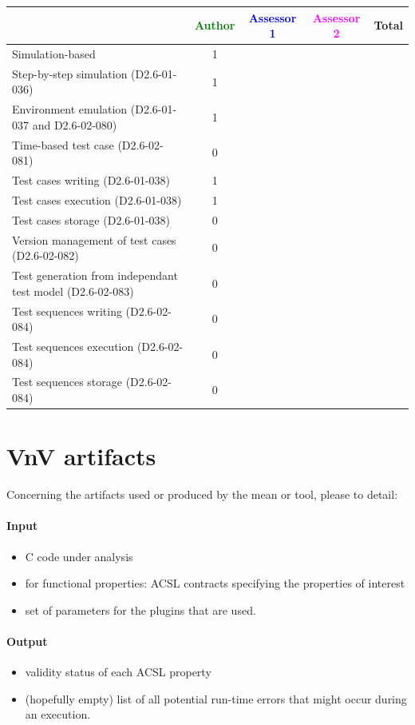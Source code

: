\begin{tabular}{|l | c | c | c | c|}
\hline
& \textcolor{green}{Author} & \textcolor{blue}{Assessor 1} & \textcolor{magenta}{Assessor 2} & Total \\
\hline 
Simulation-based & 1 & & &  \\
\hline
Step-by-step simulation (D2.6-01-036) & 1 & & &  \\
\hline
Environment emulation (D2.6-01-037 and D2.6-02-080) & 1 & & &  \\
\hline
Time-based test case (D2.6-02-081) & 0 & & &  \\
\hline
Test cases writing (D2.6-01-038) & 1 & & &  \\
\hline
Test cases execution (D2.6-01-038) & 1 & & &  \\
\hline
Test cases storage (D2.6-01-038) & 0 & & &  \\
\hline
Version management of test cases (D2.6-02-082) & 0 & & &  \\
\hline
Test generation from independant test model (D2.6-02-083) & 0 & & &  \\
\hline
Test sequences writing (D2.6-02-084) & 0 & & &  \\
\hline
Test sequences execution (D2.6-02-084) & 0 & & &  \\
\hline
Test sequences storage (D2.6-02-084) & 0 & & &  \\
\hline
\end{tabular}

\section{VnV artifacts}


Concerning the artifacts used or produced by the mean or tool, please to detail:

\paragraph{Input}
\begin{itemize}
\item C code under analysis
\item for functional properties: ACSL contracts specifying the properties of
  interest
\item set of parameters for the plugins that are used.
\end{itemize}
    
    
\paragraph{Output}
\begin{itemize}
\item validity status of each ACSL property
\item (hopefully empty) list of all potential run-time errors that might occur
  during an execution.
\end{itemize}
    
